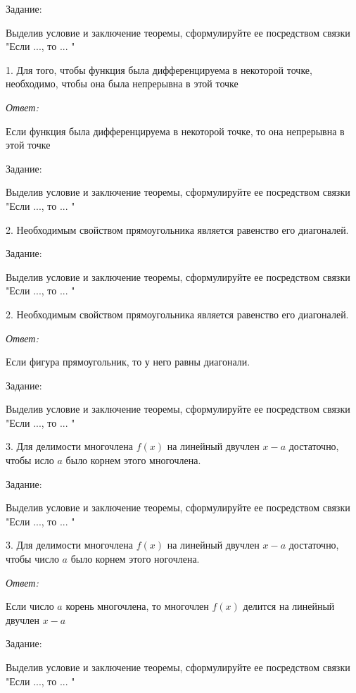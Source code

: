 \documentclass[10pt]{beamer}
\theoremstyle{remark}
\theoremstyle{definition}
\begin{document}
\begin{frame}[allowframebreaks]
\framebreak 

Задание: 

Выделив условие и заключение теоремы, сформулируйте ее посредством связки "Если ..., то ... "

1. Для того, чтобы функция была дифференцируема в некоторой точке, необходимо, чтобы она была непрерывна в этой точке

\textit{Ответ:} 

Если функция была дифференцируема в некоторой точке, то она непрерывна в этой точке

\framebreak 

Задание: 

Выделив условие и заключение теоремы, сформулируйте ее посредством связки "Если ..., то ... "

2. Необходимым свойством прямоугольника является равенство его диагоналей. 


\framebreak 

Задание: 

Выделив условие и заключение теоремы, сформулируйте ее посредством связки "Если ..., то ... "

2. Необходимым свойством прямоугольника является равенство его диагоналей. 

\textit{Ответ:} 

Если фигура прямоугольник, то у него равны диагонали.


\framebreak 

Задание: 

Выделив условие и заключение теоремы, сформулируйте ее посредством связки "Если ..., то ... "

3. Для делимости многочлена $f(x)$ на линейный двучлен $x - a$ достаточно, чтобы исло $a$ было корнем этого многочлена.


\framebreak 

Задание: 

Выделив условие и заключение теоремы, сформулируйте ее посредством связки "Если ..., то ... "

3. Для делимости многочлена $f(x)$ на линейный двучлен $x - a$ достаточно, чтобы число $a$ было корнем этого ногочлена.

\textit{Ответ:} 

Если число $a$ корень многочлена, то многочлен $f(x)$ делится на линейный двучлен $x - a$


\framebreak 

Задание: 

Выделив условие и заключение теоремы, сформулируйте ее посредством связки "Если ..., то ... "


\end{frame}
\end{document}
